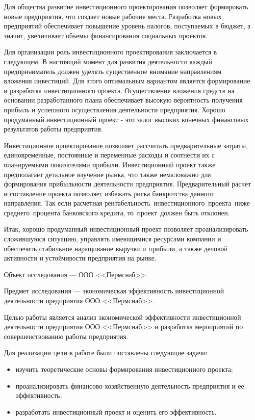 Для общества развитие инвестиционного проектирования позволяет формировать новые предприятия, что создает новые рабочие места. Разработка новых предприятий обеспечивает повышение уровень налогов, поступаемых в бюджет, а значит, увеличивает объемы финансирования социальных проектов. 

Для организации роль инвестиционного проектирования заключается в следующем. В настоящий момент для развития деятельности каждый предприниматель должен уделять существенное внимание направлениям вложения инвестиций. Для этого оптимальным вариантом является формирование и разработка инвестиционного проекта. Осуществление вложения средств на основании разработанного плана обеспечивает высокую вероятность получения прибыль и успешного осуществления деятельности предприятия. Хорошо продуманный инвестиционный проект - это залог высоких конечных финансовых результатов работы предприятия. 

Инвестиционное проектирование позволяет рассчитать предварительные затраты, единовременные, постоянные и переменные расходы и соотнести их с планируемыми показателями прибыли. Инвестиционный проект также предполагает детальное изучение рынка, что также немаловажно для формирования прибыльности деятельности предприятия. Предварительный расчет и составление проекта позволяет избежать риска банкротства данного направления. Так если расчетная рентабельность инвестиционного проекта ниже среднего процента банковского кредита, то проект должен быть отклонен. 

Итак, хорошо продуманный инвестиционный проект позволяет проанализировать сложившуюся ситуацию, управлять имеющимися ресурсами компании и обеспечить стабильное наращивание выручки и прибыли, а также деловой активности и устойчивости предприятия на рынке.

Объект исследования --- ООО <<Пермснаб>>.

Предмет исследования --- экономическая эффективность инвестиционной деятельности предприятия ООО <<Пермснаб>>.

Целью работы является анализ экономической эффективности инвестиционной деятельности предприятия ООО <<Пермснаб>> и разработка мероприятий по совершенствованию работы предприятия.

Для реализации цели в работе были поставлены следующие задачи:
\begin{itemize}
	\item изучить теоретические основы формирования инвестиционного проекта;
	\item проанализировать финансово-хозяйственную деятельность предприятия и ее эффективность;
	\item разработать инвестиционный проект и оценить его эффективность.
\end{itemize}

